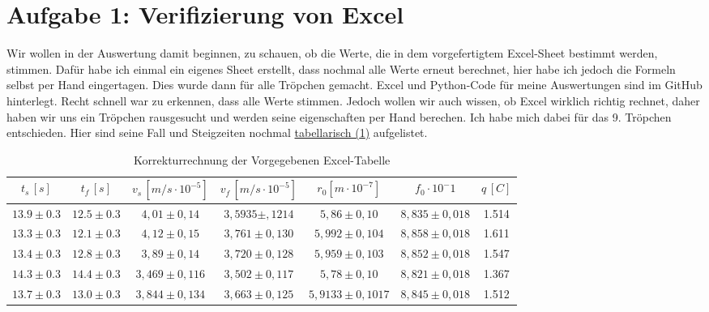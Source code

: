 \twocolumn


\section{Aufgabe 1: Verifizierung von Excel}
Wir wollen in der Auswertung damit beginnen, zu schauen, ob die Werte, die in dem vorgefertigtem Excel-Sheet bestimmt werden, stimmen. Dafür habe ich einmal ein 
eigenes Sheet erstellt, dass nochmal alle Werte erneut berechnet, hier habe ich jedoch die Formeln selbst per Hand eingertagen. Dies wurde dann für alle Tröpchen gemacht.
Excel und Python-Code für meine Auswertungen sind im GitHub \cite{githubPAP1} hinterlegt. Recht schnell war zu erkennen, dass alle Werte stimmen. 
Jedoch wollen wir auch wissen, ob Excel wirklich richtig rechnet, daher haben wir uns ein Tröpchen rausgesucht und werden seine eigenschaften per Hand berechen.
Ich habe mich dabei für das 9. Tröpchen entschieden. Hier sind seine Fall und Steigzeiten nochmal \hyperref[tab:testing]{tabellarisch (\ref*{tab:testing})} aufgelistet.
\begin{table}[b]
    \onecolumn
    \centering
    \begin{tabular}{ c | c | c | c | c | c | c}
        \toprule
        $t_s \,  [s]$ & $t_f \,  [s]$ & $v_s \,  [m/s \cdot 10^{-5}]$ & $v_f \,  [m/s \cdot 10^{-5}]$ & $r_0 [m\cdot 10^{-7}]$ & $f_0 \cdot 10^-{1}$ & $q \, [C]$ \\
        \midrule
        $13.9 \pm 0.3$ & $12.5 \pm 0.3$ & $4,01 \pm 0,14$ & $3,5935 \pm ,1214$ & $5,86 \pm 0,10$ & $8,835 \pm 0,018$ & 1.514 \\
        $13.3 \pm 0.3$ & $12.1 \pm 0.3$ & $4,12 \pm 0,15$ & $3,761 \pm 0,130$ & $5,992 \pm 0,104$ & $8,858 \pm 0,018$ & 1.611 \\
        $13.4 \pm 0.3$ & $12.8 \pm 0.3$ & $3,89 \pm 0,14$ & $3,720 \pm 0,128$ & $5,959 \pm 0,103$ & $8,852 \pm 0,018$ & 1.547 \\
        $14.3 \pm 0.3$ & $14.4 \pm 0.3$ & $3,469 \pm 0,116$ & $3,502 \pm 0,117$ & $5,78 \pm 0,10$ & $8,821 \pm 0,018$ & 1.367 \\
        $13.7 \pm 0.3$ & $13.0 \pm 0.3$ & $3,844 \pm 0,134$ & $3,663 \pm 0,125$ & $5,9133 \pm 0,1017$ & $8,845 \pm 0,018$ & 1.512 \\
        \bottomrule
    \end{tabular}
    \label{tab:testing}
    \caption{Korrekturrechnung der Vorgegebenen Excel-Tabelle}
    \twocolumn
\end{table}

